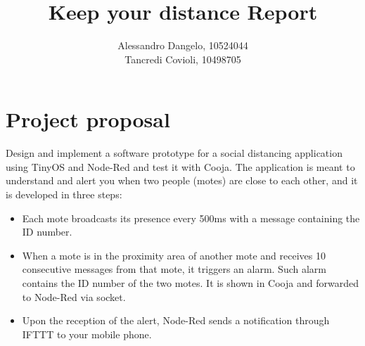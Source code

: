 \documentclass[11pt]{article}
\author{Alessandro Dangelo, 10524044 \\
Tancredi Covioli, 10498705}
\date{}
\title{Keep your distance Report}
\begin{document}
\maketitle

\section{Project proposal}
Design and implement a software prototype for a social distancing application using TinyOS and Node-Red and test it with Cooja. The application is meant to understand and alert you when two people (motes) are close to each other, and it is developed in three steps:

\begin{itemize}
    \item Each mote broadcasts its presence every 500ms with a message containing the ID number.
    \item When a mote is in the proximity area of another mote and receives 10 consecutive messages from that mote, it triggers an alarm. Such alarm contains the ID number of the two motes. It is shown in Cooja and forwarded to Node-Red via socket. 
    \item Upon the reception of the alert, Node-Red sends a notification through IFTTT to your mobile phone.
\end{itemize}
\end{document}
